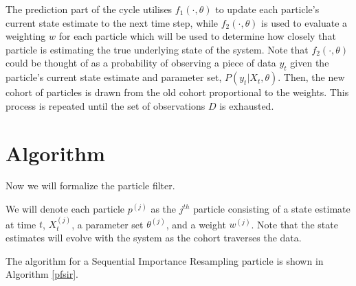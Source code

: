 	The prediction part of the cycle utilises $f_1 (\cdot, \theta)$ to update each particle's current state estimate to the next time step, while $f_2 (\cdot, \theta)$ is used to evaluate a weighting $w$ for each particle which will be used to determine how closely that particle is estimating the true underlying state of the system. Note that $f_2 (\cdot, \theta)$ could be thought of as a probability of observing a piece of data $y_t$ given the particle's current state estimate and parameter set, $P(y_t | X_t, \theta)$. Then, the new cohort of particles is drawn from the old cohort proportional to the weights. This process is repeated until the set of observations $D$ is exhausted.


\section{Algorithm}

    Now we will formalize the particle filter.

    We will denote each particle $p^{(j)}$ as the $j^{th}$ particle consisting of a state estimate at time $t$, $X_t^{(j)}$, a parameter set $\theta^{(j)}$, and a weight $w^{(j)}$. Note that the state estimates will evolve with the system as the cohort traverses the data.

    The algorithm for a Sequential Importance Resampling particle is shown in Algorithm \ref{pfsir}.\\
    
